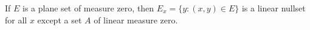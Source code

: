 If $E$ is a plane set of measure zero, then $E_x = \{y : (x, y) \in E\}$ is a linear nullset for all $x$ except a set $A$ of linear measure zero.
